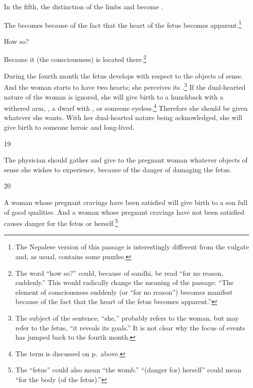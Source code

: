 \begin{translation}
In the fifth, the distinction of the limbs and  become .
    
The  becomes
 because of the fact that the heart of the
fetus becomes apparent.\footnote{The Nepalese version of this passage
    is interestingly different from the vulgate and, as usual, contains
    some puzzles.}   
    
    How so?  
    
    Because it (the consciousness) is located
    there.\footnote{The word  “how so?” could, because of
        sandhi, be read  “for no reason, suddenly.”  This would
        radically change the meaning of the passage: “The element of
        consciousness suddenly (or “for no reason”) becomes manifest because
        of the fact that the heart of the fetus becomes apparent.”} 
        
        During the
        fourth month the fetus develops  with
        respect to the objects of sense. And the woman starts to have two
        hearts; she perceives its .\footnote{The subject
            of the sentence, “she,” probably refers to the woman, but may refer to
            the fetus, “it reveals its goals.”  It is not clear why the focus of
            events has jumped back to the fourth month.} If the dual-hearted
            nature of the woman is ignored, she will give birth to a hunchback
            with a withered arm, , a dwarf with
            , or someone eyeless.\footnote{The
                term  is discussed on p.\,\pageref{ṣaṇḍha} above.}
                Therefore she should be given whatever she wants. With her
                dual-hearted nature being acknowledged, she will give birth to someone
                heroic and long-lived.
        

\item[19]

The physician should gather and give to the pregnant woman whatever objects of 
sense she wishes to experience, because of the danger of damaging the fetus. 

\item [20]

A woman whose pregnant cravings have been satisfied will give birth to
a son full of good qualities.  And a woman whose pregnant cravings
have not been satisfied causes danger for the fetus or
herself.\footnote{The  “fetus” could also mean “the womb.”
     “(danger for) herself” could mean “for the body (of the
    fetus).”}
    

\end{translation}
